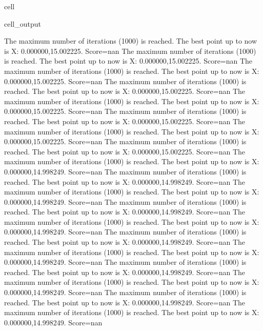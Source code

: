 \documentclass[letterpaper,10pt,english]{jupyterBook}
\begin{document}
\begin{sphinxuseclass}{cell}
\begin{sphinxVerbatimOutput}
\begin{sphinxuseclass}{cell_output}
\begin{sphinxVerbatim}[commandchars=\\\{\}]
The maximum number of iterations (1000) is reached. The best point up to now is X: \PYGZob{}0.000000,15.002225\PYGZcb{}. Score=\PYGZhy{}nan
The maximum number of iterations (1000) is reached. The best point up to now is X: \PYGZob{}0.000000,15.002225\PYGZcb{}. Score=\PYGZhy{}nan
The maximum number of iterations (1000) is reached. The best point up to now is X: \PYGZob{}0.000000,15.002225\PYGZcb{}. Score=\PYGZhy{}nan
The maximum number of iterations (1000) is reached. The best point up to now is X: \PYGZob{}0.000000,15.002225\PYGZcb{}. Score=\PYGZhy{}nan
The maximum number of iterations (1000) is reached. The best point up to now is X: \PYGZob{}0.000000,15.002225\PYGZcb{}. Score=\PYGZhy{}nan
The maximum number of iterations (1000) is reached. The best point up to now is X: \PYGZob{}0.000000,15.002225\PYGZcb{}. Score=\PYGZhy{}nan
The maximum number of iterations (1000) is reached. The best point up to now is X: \PYGZob{}0.000000,15.002225\PYGZcb{}. Score=\PYGZhy{}nan
The maximum number of iterations (1000) is reached. The best point up to now is X: \PYGZob{}0.000000,15.002225\PYGZcb{}. Score=\PYGZhy{}nan
The maximum number of iterations (1000) is reached. The best point up to now is X: \PYGZob{}0.000000,14.998249\PYGZcb{}. Score=\PYGZhy{}nan
The maximum number of iterations (1000) is reached. The best point up to now is X: \PYGZob{}0.000000,14.998249\PYGZcb{}. Score=\PYGZhy{}nan
The maximum number of iterations (1000) is reached. The best point up to now is X: \PYGZob{}0.000000,14.998249\PYGZcb{}. Score=\PYGZhy{}nan
The maximum number of iterations (1000) is reached. The best point up to now is X: \PYGZob{}0.000000,14.998249\PYGZcb{}. Score=\PYGZhy{}nan
The maximum number of iterations (1000) is reached. The best point up to now is X: \PYGZob{}0.000000,14.998249\PYGZcb{}. Score=\PYGZhy{}nan
The maximum number of iterations (1000) is reached. The best point up to now is X: \PYGZob{}0.000000,14.998249\PYGZcb{}. Score=\PYGZhy{}nan
The maximum number of iterations (1000) is reached. The best point up to now is X: \PYGZob{}0.000000,14.998249\PYGZcb{}. Score=\PYGZhy{}nan
The maximum number of iterations (1000) is reached. The best point up to now is X: \PYGZob{}0.000000,14.998249\PYGZcb{}. Score=\PYGZhy{}nan
The maximum number of iterations (1000) is reached. The best point up to now is X: \PYGZob{}0.000000,14.998249\PYGZcb{}. Score=\PYGZhy{}nan
The maximum number of iterations (1000) is reached. The best point up to now is X: \PYGZob{}0.000000,14.998249\PYGZcb{}. Score=\PYGZhy{}nan
The maximum number of iterations (1000) is reached. The best point up to now is X: \PYGZob{}0.000000,14.998249\PYGZcb{}. Score=\PYGZhy{}nan

\end{sphinxVerbatim}
\end{sphinxuseclass}
\end{sphinxVerbatimOutput}
\end{sphinxuseclass}
\end{document}
